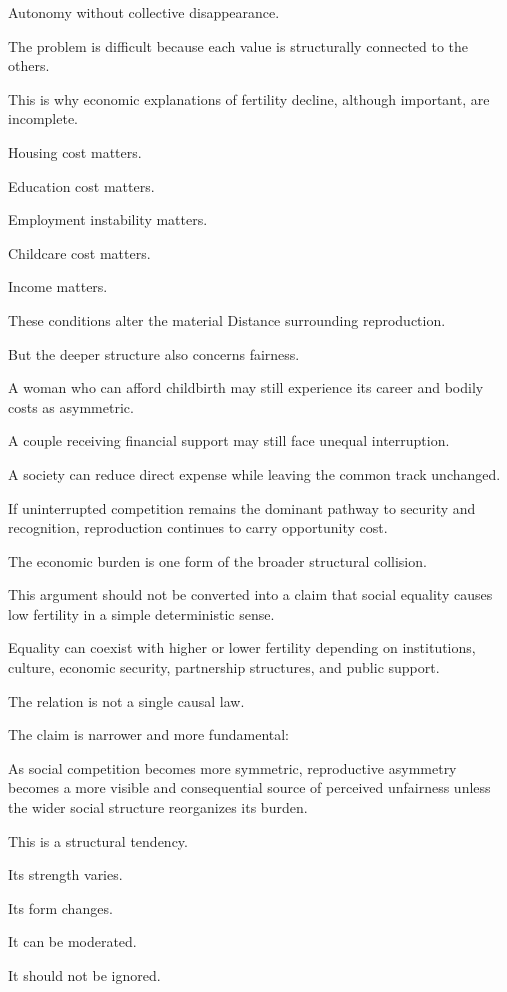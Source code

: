 Autonomy without collective disappearance.

The problem is difficult because each value is structurally connected to the others.

This is why economic explanations of fertility decline, although important, are incomplete.

Housing cost matters.

Education cost matters.

Employment instability matters.

Childcare cost matters.

Income matters.

These conditions alter the material Distance surrounding reproduction.

But the deeper structure also concerns fairness.

A woman who can afford childbirth may still experience its career and bodily costs as asymmetric.

A couple receiving financial support may still face unequal interruption.

A society can reduce direct expense while leaving the common track unchanged.

If uninterrupted competition remains the dominant pathway to security and recognition, reproduction continues to carry opportunity cost.

The economic burden is one form of the broader structural collision.

This argument should not be converted into a claim that social equality causes low fertility in a simple deterministic sense.

Equality can coexist with higher or lower fertility depending on institutions, culture, economic security, partnership structures, and public support.

The relation is not a single causal law.

The claim is narrower and more fundamental:

As social competition becomes more symmetric, reproductive asymmetry becomes a more visible and consequential source of perceived unfairness unless the wider social structure reorganizes its burden.

This is a structural tendency.

Its strength varies.

Its form changes.

It can be moderated.

It should not be ignored.

